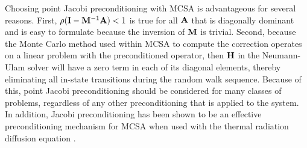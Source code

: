 Choosing point Jacobi preconditioning with MCSA is advantageous for
several reasons. First, $\rho(\mathbf{I} - \mathbf{M}^{-1}\mathbf{A}) < 1$ is true
for all $\mathbf{A}$ that is diagonally dominant and is easy to formulate
because the inversion of $\mathbf{M}$ is trivial. Second, because the
Monte Carlo method used within MCSA to compute the correction operates
on a linear problem with the preconditioned operator, then $\mathbf{H}$ in
the Neumann-Ulam solver will have a zero term in each of its diagonal
elements, thereby eliminating all in-state transitions during the
random walk sequence. Because of this, point Jacobi preconditioning
should be considered for many classes of problems, regardless of any
other preconditioning that is applied to the system. In addition,
Jacobi preconditioning has been shown to be an effective
preconditioning mechanism for MCSA when used with the thermal
radiation diffusion equation \cite{evans_monte_2012}.

\clearpage

